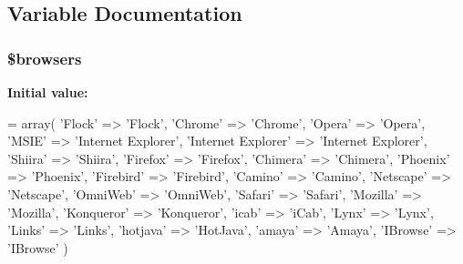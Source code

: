 \subsection{Variable Documentation}
\hypertarget{user__agents_8php_a81edf933083b5ac5b380385f59074a7d}{
\subsubsection[{\$browsers}]{\setlength{\rightskip}{0pt plus 5cm}\$browsers}}\label{user__agents_8php_a81edf933083b5ac5b380385f59074a7d}
{\bfseries Initial value\-:}
\begin{DoxyCode}
= array(
                    \textcolor{stringliteral}{'Flock'}             => \textcolor{stringliteral}{'Flock'},
                    \textcolor{stringliteral}{'Chrome'}            => \textcolor{stringliteral}{'Chrome'},
                    \textcolor{stringliteral}{'Opera'}             => \textcolor{stringliteral}{'Opera'},
                    \textcolor{stringliteral}{'MSIE'}              => \textcolor{stringliteral}{'Internet Explorer'},
                    \textcolor{stringliteral}{'Internet Explorer'} => \textcolor{stringliteral}{'Internet Explorer'},
                    \textcolor{stringliteral}{'Shiira'}            => \textcolor{stringliteral}{'Shiira'},
                    \textcolor{stringliteral}{'Firefox'}           => \textcolor{stringliteral}{'Firefox'},
                    \textcolor{stringliteral}{'Chimera'}           => \textcolor{stringliteral}{'Chimera'},
                    \textcolor{stringliteral}{'Phoenix'}           => \textcolor{stringliteral}{'Phoenix'},
                    \textcolor{stringliteral}{'Firebird'}          => \textcolor{stringliteral}{'Firebird'},
                    \textcolor{stringliteral}{'Camino'}            => \textcolor{stringliteral}{'Camino'},
                    \textcolor{stringliteral}{'Netscape'}          => \textcolor{stringliteral}{'Netscape'},
                    \textcolor{stringliteral}{'OmniWeb'}           => \textcolor{stringliteral}{'OmniWeb'},
                    \textcolor{stringliteral}{'Safari'}            => \textcolor{stringliteral}{'Safari'},
                    \textcolor{stringliteral}{'Mozilla'}           => \textcolor{stringliteral}{'Mozilla'},
                    \textcolor{stringliteral}{'Konqueror'}         => \textcolor{stringliteral}{'Konqueror'},
                    \textcolor{stringliteral}{'icab'}              => \textcolor{stringliteral}{'iCab'},
                    \textcolor{stringliteral}{'Lynx'}              => \textcolor{stringliteral}{'Lynx'},
                    \textcolor{stringliteral}{'Links'}             => \textcolor{stringliteral}{'Links'},
                    \textcolor{stringliteral}{'hotjava'}           => \textcolor{stringliteral}{'HotJava'},
                    \textcolor{stringliteral}{'amaya'}             => \textcolor{stringliteral}{'Amaya'},
                    \textcolor{stringliteral}{'IBrowse'}           => \textcolor{stringliteral}{'IBrowse'}
                )
\end{DoxyCode}


